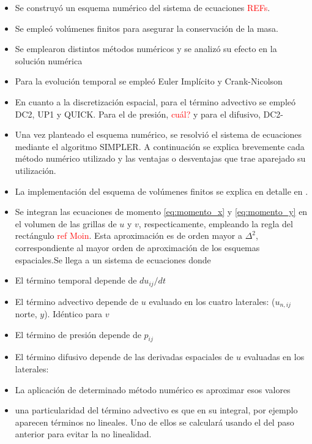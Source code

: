 \documentclass[aps,prb,twocolumn,superscriptaddress,floatfix,longbibliography,10pt]{revtex4-2}
\newif\ifptitle
\newif\ifpnumber
\newcounter{para}
\newcommand\ptitle[1]{\par\refstepcounter{para}
{\ifpnumber{\noindent\textcolor{lightgray}{\textbf{\thepara}}\indent}\fi}
{\ifptitle{\textbf{[{#1}]}}\fi}}
\begin{document}
\ptitle{Resumen}
\begin{itemize}
  \item Se construyó un esquema numérico del sistema de ecuaciones \textcolor{red}{REFs}.
  \item Se empleó volúmenes finitos para asegurar la conservación de la masa.
  \item Se emplearon distintos métodos numéricos y se analizó su efecto en la solución numérica
  \item Para la evolución temporal se empleó Euler Implícito y Crank-Nicolson
  \item En cuanto a la discretización espacial, para el término advectivo se empleó DC2, UP1 y QUICK. Para el de presión, \textcolor{red}{cuál?} y para el difusivo, DC2-
  \item Una vez planteado el esquema numérico, se resolvió el sistema de ecuaciones mediante el algoritmo SIMPLER. A continuación se explica brevemente cada método numérico utilizado y las ventajas o desventajas que trae aparejado su utilización.
\end{itemize}

\ptitle{Volúmenes finitos}
\begin{itemize}
\item La implementación del esquema de volúmenes finitos se explica en detalle en \cite{Notas_materia}.
\item Se integran las ecuaciones de momento \ref{eq:momento_x} y \ref{eq:momento_y} en el volumen de las grillas de $u$ y $v$, respecticamente, empleando la regla del rectángulo \textcolor{red}{ref Moin}. Esta aproximación es de orden mayor a $\Delta^2$, correspondiente al mayor orden de aproximación de los esquemas espaciales.Se llega a un sistema de ecuaciones donde
\item El término temporal depende de $du_{ij}/dt$
\item El término advectivo depende de $u$ evaluado en los cuatro laterales: ($u_{n,ij}$ norte, $y$). Idéntico para $v$
\item El término de presión depende de $p_{ij}$
\item El término difusivo depende de las derivadas espaciales de $u$ evaluadas en los laterales:
\item La aplicación de determinado método numérico es aproximar esos valores
\item una particularidad del término advectivo es que en su integral, por ejemplo
\[ \]
aparecen términos no lineales. Uno de ellos se calculará usando el del paso anterior para evitar la no linealidad.
\end{itemize}
\end{document}
